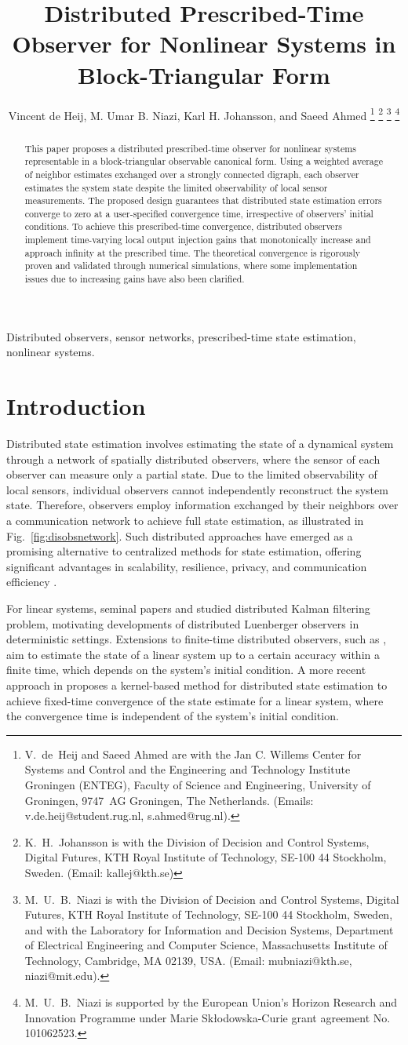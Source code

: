\documentclass[journal]{IEEEtran}
\title{Distributed Prescribed-Time Observer for Nonlinear Systems in Block-Triangular Form}
\author{Vincent de Heij, M. Umar B. Niazi, Karl H. Johansson, and Saeed Ahmed
\thanks{
V.~de~Heij and Saeed Ahmed are with the Jan C. Willems Center for Systems and Control and the Engineering and Technology Institute Groningen (ENTEG), Faculty of Science and Engineering, University of Groningen, 9747~AG Groningen, The Netherlands. (Emails: v.de.heij@student.rug.nl, s.ahmed@rug.nl).}
\thanks{K.~H.~Johansson is with the Division of Decision and Control Systems, Digital Futures, KTH Royal Institute of Technology, SE-100 44 Stockholm, Sweden. (Email: kallej@kth.se)}
\thanks{M.~U.~B.~Niazi is with the Division of Decision and Control Systems, Digital Futures, KTH Royal Institute of Technology, SE-100 44 Stockholm, Sweden, and with the Laboratory for Information and Decision Systems, Department of Electrical Engineering and Computer Science, Massachusetts Institute of Technology, Cambridge, MA 02139, USA.
(Email: mubniazi@kth.se, niazi@mit.edu).}
\thanks{M.~U.~B.~Niazi is supported by the European Union’s Horizon Research and Innovation Programme under Marie Sk{\l}odowska-Curie grant agreement No. 101062523.}
}
\begin{document}
\maketitle

\begin{abstract}
This paper proposes a distributed prescribed-time observer for nonlinear systems representable in a block-triangular observable canonical form. Using a weighted average of neighbor estimates exchanged over a strongly connected digraph, each observer estimates the system state despite the limited observability of local sensor measurements. The proposed design guarantees that distributed state estimation errors converge to zero at a user-specified convergence time, irrespective of observers' initial conditions. To achieve this prescribed-time convergence, distributed observers implement time-varying local output injection gains that monotonically increase and approach infinity at the prescribed time. The theoretical convergence is rigorously proven and validated through numerical simulations, where some implementation issues due to increasing gains have also been clarified.
\end{abstract}

\begin{IEEEkeywords}
    Distributed observers, sensor networks, prescribed-time state estimation, nonlinear systems.
\end{IEEEkeywords}


\section{Introduction}
Distributed state estimation involves estimating the state of a dynamical system through a network of spatially distributed observers, where the sensor of each observer can measure only a partial state. Due to the limited observability of local sensors, individual observers cannot independently reconstruct the system state. Therefore, observers employ information exchanged by their neighbors over a communication network to achieve full state estimation, as illustrated in Fig.~\ref{fig:disobsnetwork}. Such distributed approaches have emerged as a promising alternative to centralized methods for state estimation, offering significant advantages in scalability, resilience, privacy, and communication efficiency \cite{Tajer2010}.

For linear systems, seminal papers \cite{Olfati2007} and \cite{Khan2008} studied distributed Kalman filtering problem, motivating developments of distributed Luenberger observers \cite{Kim2016, Park2017, Wang2018, Trentelman19} in deterministic settings. Extensions to finite-time distributed observers, such as \cite{Silm2020,Ortega2021}, aim to estimate the state of a linear system up to a certain accuracy within a finite time, which depends on the system's initial condition. A more recent approach in \cite{Ge2023} proposes a kernel-based method for distributed state estimation to achieve fixed-time convergence of the state estimate for a linear system, where the convergence time is independent of the system's initial condition.
\end{document}
